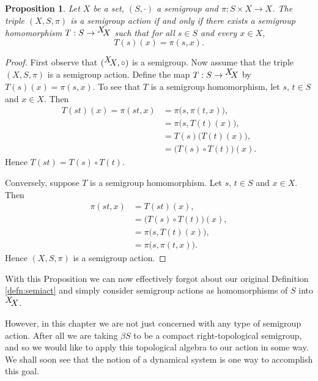 \documentclass[12pt]{article}
\theoremstyle{plain}
\newtheorem{prop}[thm]{Proposition}
\theoremstyle{definition}
\newcommand{\setfunc}[2]{\hbox{${}^{\hbox{$#1$}}\hskip -3 pt #2$}}
\begin{document}
  \begin{prop} 
    \label{prop:semiact}
    Let $X$ be a set, $(S,\cdot)$ a semigroup and $\pi : S \times X \to X$.
    The triple $(X, S, \pi)$ is a semigroup action if and only if
    there exists a semigroup homomorphism $T : S \to \setfunc{X}{X}$ such
    that for all $s \in S$ and every $x \in X$,
      \[ T(s)(x) = \pi(s,x). \]
  \end{prop}
  \begin{proof}
    First observe that $(\setfunc{X}{X}, \circ)$ is a semigroup.
    Now assume that the triple $(X, S, \pi)$ is a semigroup action. 
    Define the map $T : S \to \setfunc{X}{X}$ by $T(s)(x) =
    \pi(s,x)$.
    To see that $T$ is a semigroup homomorphism, let $s$, $t \in S$
    and $x \in X$. 
    Then 
      \begin{align*}
        T(st)(x) = \pi(st,x) &= \pi\bigl(s, \pi(t,x)\bigr), \\
        &= \pi\bigl(s, T(t)(x)\bigr), \\
        &= T(s)\bigl(T(t)(x)\bigr), \\
        &= \bigl(T(s) \circ T(t)\bigr) (x).
      \end{align*}
    Hence $T(st) = T(s) \circ T(t)$.

    Conversely, suppose $T$ is a semigroup homomorphism. 
    Let $s$, $t \in S$ and $x \in X$.
    Then 
      \begin{align*}
        \pi(st, x) &= T(st)(x), \\
        &= \bigl(T(s) \circ T(t)\bigr) (x), \\
        &= \pi\bigl(s, T(t)(x)\bigr), \\
        &= \pi\bigl(s, \pi(t,x)\bigr).
      \end{align*}
    Hence $(X, S, \pi)$ is a semigroup action.
  \end{proof}

With this Proposition we can now effectively forgot about our original Definition \ref{defn:semiact} and simply consider semigroup actions as homomorphisms of $S$ into $\setfunc{X}{X}$. 

However, in this chapter we are not just concerned with any type of semigroup action.
After all we are taking $\beta S$ to be a compact right-topological semigroup, and so we would like to apply this topological algebra to our action in some way. 
We shall soon see that the notion of a dynamical system is one way to accomplish this goal.
\end{document}
